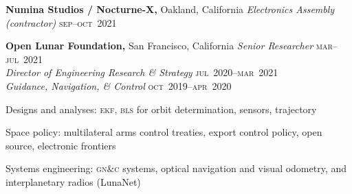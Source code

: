\documentclass[12pt,letterpaper]{article}
\newenvironment{itemize*}%
{\begin{itemize}%
  \setlength{\itemsep}{0pt}}%
{\end{itemize}}
\newcommand{\rdate}[1]{{\hfill #1}}
\begin{document}
%
\medskip
\textbf{Numina Studios / Nocturne-X,} Oakland, California \newline
\emph{Electronics Assembly (contractor)} \rdate{\textsc{sep}--\textsc{oct}~2021}
%
%

\medskip
\textbf{Open Lunar Foundation,} San Francisco, California \newline
\emph{Senior Researcher} \rdate{\textsc{mar}--\textsc{jul}~2021} \\
\emph{Director of Engineering Research \& Strategy} \rdate{\textsc{jul}~2020--\textsc{mar}~2021} \\
\emph{Guidance, Navigation, \& Control} \rdate{\textsc{oct}~2019--\textsc{apr}~2020}
\begin{itemize*}
  \item Designs and analyses: \textsc{ekf}, \textsc{bls} for orbit determination, sensors, trajectory
  \item Space policy: multilateral arms control treaties, export control policy, open source, electronic frontiers
  \item Systems engineering: \textsc{gn\&c} systems, optical navigation and visual odometry, and interplanetary radios (LunaNet)
\end{itemize*}
\end{document}
